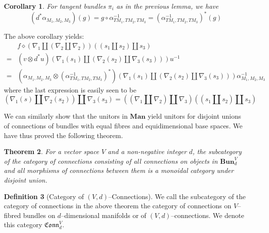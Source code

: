 \documentclass{amsart}
\newcommand{\tensor}{\otimes}
\newcommand{\br}[1]{\left( #1 \right)}
\newcommand{\Man}{\textbf{Man}}
\newcommand{\Bun}{\textbf{Bun}}
\newcommand{\Conn}{\mathfrak{Conn}}
\newtheorem{thm}{Theorem}
\numberwithin{thm}{section}
\newtheorem{cor}[thm]{Corollary}
\theoremstyle{definition}
\newtheorem{defn}[thm]{Definition}
\begin{document}
\begin{cor}
For tangent bundles $\pi_i$ as in the previous lemma, we have
\[
  (d^*\alpha_{M_1, M_2, M_3})(g) = g \circ \alpha_{TM_1, TM_2, TM_3}^{-1}
    = \br{\alpha^{-1}_{TM_1, TM_2, TM_3}}^*(g)
\]
\end{cor}
The above corollary yields:
\begin{align*}
   & f \diamond (\nabla_1 \amalg (\nabla_2 \amalg \nabla_2))(
        (s_1 \amalg s_2) \amalg s_3
     ) \\
  =& (v \tensor d^*u)(
      \nabla_1(s_1) \amalg (\nabla_2(s_2) \amalg \nabla_3(s_3))
     )u^{-1} \\
  =& \br{\alpha_{M_1, M_2, M_3} \tensor \br{\alpha^{-1}_{TM_1, TM_2, TM_3}}^*}(
      \nabla_1(s_1) \amalg (\nabla_2(s_2) \amalg \nabla_3(s_3))
     )\alpha_{M_1, M_2, M_3}^{-1}
\end{align*}
where the last expression is easily seen to be
\[
  (\nabla_1(s) \amalg \nabla_2(s_2)) \amalg \nabla_3(s_3)
  = ((\nabla_1 \amalg \nabla_2) \amalg \nabla_3)((s_1 \amalg s_2) \amalg s_3)
\]

We can similarly show that the unitors in $\Man$ yield unitors for disjoint
unions of connections of bundles with equal fibres and equidimensional base
spaces. We have thus proved the following theorem.
\begin{thm}\label{thm:bundle_gluing}
For a vector space $V$ and a non-negative integer $d$, the subcategory of the
category of connections consisting of all connections on objects in
$\Bun_d^{V}$ and all morphisms of connections between them is a monoidal
category under disjoint union.
\end{thm}
\begin{defn}[Category of {$(V, d)$}--Connections]
We call the subcategory of the category of connections in the above theorem the
category of connections on $V$--fibred bundles on $d$--dimensional manifolds or
of $(V, d)$--connections. We denote this category $\Conn^V_d$.
\end{defn}
\end{document}
